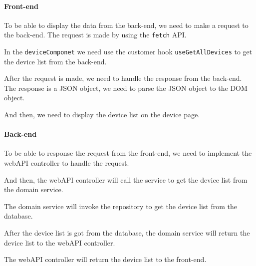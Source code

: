 \paragraph{Front-end}
To be able to display the data from the back-end, we need to make a request to
the back-end. The request is made by using the \texttt{fetch} API. 

In the \texttt{deviceComponet} we need use the customer hook \texttt{useGetAllDevices}
to get the device list from the back-end. 

After the request is made, we need to handle the response from the back-end.
The response is a JSON object, we need to parse the JSON object to the DOM object.

And then, we need to display the device list on the device page.

\paragraph{Back-end}

To be able to response the request from the front-end, we need to implement the webAPI controller
to handle the request.

And then, the webAPI controller will call the service to get the device list from the domain service.

The domain service will invoke the repository to get the device list from the database.

After the device list is got from the database, the domain service will return the device list to the webAPI controller.

The webAPI controller will return the device list to the front-end.
